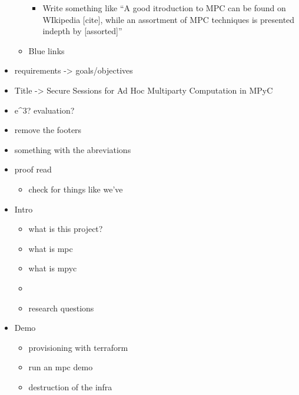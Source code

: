 \documentclass[
]{article}
\providecommand{\tightlist}{%
  \setlength{\itemsep}{0pt}\setlength{\parskip}{0pt}}
\begin{document}
\begin{itemize}
\begin{itemize}
            \begin{itemize}
              \tightlist
              \item
                    Write something like ``A good itroduction to MPC can be found on
                    WIkipedia {[}cite{]}, while an assortment of MPC techniques is
                    presented indepth by {[}assorted{]}''
            \end{itemize}
          \item
                Blue links
        \end{itemize}
  \item
        requirements -\textgreater{} goals/objectives
  \item
        Title -\textgreater{} Secure Sessions for Ad Hoc Multiparty
        Computation in MPyC
  \item
        e\^{}3? evaluation?
  \item
        remove the footers
  \item
        something with the abreviations
  \item
        proof read

        \begin{itemize}
          \tightlist
          \item
                check for things like we've
        \end{itemize}
  \item
        Intro

        \begin{itemize}
          \tightlist
          \item
                what is this project?
          \item
                what is mpc
          \item
                what is mpyc
          \item
          \item
                research questions
        \end{itemize}
  \item
        Demo

        \begin{itemize}
          \tightlist
          \item
                provisioning with terraform
          \item
                run an mpc demo
          \item
                destruction of the infra
        \end{itemize}
\end{itemize}

\printbibliography
\end{document}
